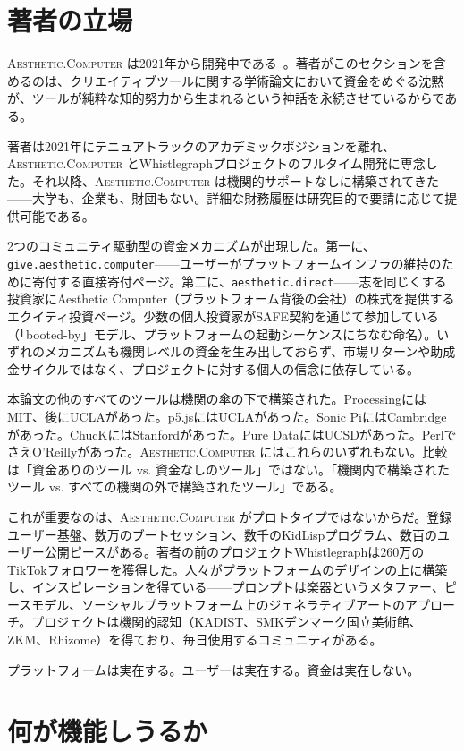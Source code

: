 \documentclass[10pt,letterpaper,twocolumn]{article}
\newcommand{\ac}{\textsc{Aesthetic.Computer}}
\begin{document}
\section{著者の立場}

\ac{} は2021年から開発中である~\citep{scudder2026ac}。著者がこのセクションを含めるのは、クリエイティブツールに関する学術論文において資金をめぐる沈黙が、ツールが純粋な知的努力から生まれるという神話を永続させているからである。

著者は2021年にテニュアトラックのアカデミックポジションを離れ、\ac{} とWhistlegraphプロジェクトのフルタイム開発に専念した。それ以降、\ac{} は機関的サポートなしに構築されてきた——大学も、企業も、財団もない。詳細な財務履歴は研究目的で要請に応じて提供可能である。

2つのコミュニティ駆動型の資金メカニズムが出現した。第一に、\texttt{give.aesthetic.computer}——ユーザーがプラットフォームインフラの維持のために寄付する直接寄付ページ。第二に、\texttt{aesthetic.direct}——志を同じくする投資家にAesthetic Computer（プラットフォーム背後の会社）の株式を提供するエクイティ投資ページ。少数の個人投資家がSAFE契約を通じて参加している（「booted-by」モデル、プラットフォームの起動シーケンスにちなむ命名）。いずれのメカニズムも機関レベルの資金を生み出しておらず、市場リターンや助成金サイクルではなく、プロジェクトに対する個人の信念に依存している。

本論文の他のすべてのツールは機関の傘の下で構築された。ProcessingにはMIT、後にUCLAがあった。p5.jsにはUCLAがあった。Sonic PiにはCambridgeがあった。ChucKにはStanfordがあった。Pure DataにはUCSDがあった。PerlでさえO'Reillyがあった。\ac{} にはこれらのいずれもない。比較は「資金ありのツール vs. 資金なしのツール」ではない。「機関内で構築されたツール vs. すべての機関の外で構築されたツール」である。

これが重要なのは、\ac{} がプロトタイプではないからだ。登録ユーザー基盤、数万のブートセッション、数千のKidLispプログラム、数百のユーザー公開ピースがある。著者の前のプロジェクトWhistlegraphは260万のTikTokフォロワーを獲得した。人々がプラットフォームのデザインの上に構築し、インスピレーションを得ている——プロンプトは楽器というメタファー、ピースモデル、ソーシャルプラットフォーム上のジェネラティブアートのアプローチ。プロジェクトは機関的認知（KADIST、SMKデンマーク国立美術館、ZKM、Rhizome）を得ており、毎日使用するコミュニティがある。

プラットフォームは実在する。ユーザーは実在する。資金は実在しない。

\section{何が機能しうるか}
\end{document}
